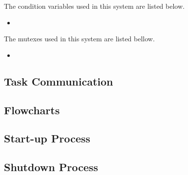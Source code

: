 The condition variables used in this system are listed below.

\begin{itemize}
	\item
		
\end{itemize}

The mutexes used in this system are listed bellow.

\begin{itemize}
	\item 
	
\end{itemize}


\subsection{Task Communication}

\subsection{Flowcharts}


\subsection{Start-up Process}

\subsection{Shutdown Process}
